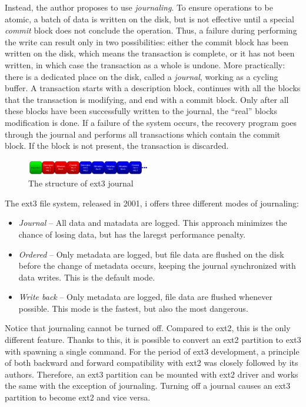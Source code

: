 \documentclass{acm_proc_article-sp}
\begin{document}
Instead, the author proposes to use {\it journaling}. To ensure operations to be atomic, a batch of data is written on the disk, but is not effective until a special {\it commit} block does not conclude the operation. Thus, a failure during performing the write can result only in two possibilities: either the commit block has been written on the disk, which means the transaction is complete, or it has not been written, in which case the transaction as a whole is undone. More practically: there is a dedicated place on the disk, called a {\it journal}, working as a cycling buffer. A transaction starts with a description block, continues with all the blocks that the transaction is modifying, and end with a commit block. Only after all these blocks have been successfully written to the journal, the ``real'' blocks modification is done. If a failure of the system occurs, the recovery program goes through the journal and performs all transactions which contain the commit block. If the block is not present, the transaction is discarded.

\begin{figure}
\centering
\includegraphics[width=0.48\textwidth]{images/journal.pdf}
	\caption{The structure of ext3 journal \cite{takingadvantage}}
\end{figure}

The ext3 file system, released in 2001, i offers three different modes of journaling: \cite{takingadvantage}

\begin{itemize}
	\item {\it Journal} -- All data and matadata are logged. This approach minimizes the chance of losing data, but has the laregst performance penalty.
	\item {\it Ordered} -- Only metadata are logged, but file data are flushed on the disk before the change of metadata occurs, keeping the journal synchronized with data writes. This is the default mode.
	\item {\it Write back} -- Only metadata are logged, file data are flushed whenever possible. This mode is the fastest, but also the most dangerous.
\end{itemize}

Notice that journaling cannot be turned off. Compared to ext2, this is the only different feature. Thanks to this, it is possible to convert an ext2 partition to ext3 with spawning a single command.
For the period of ext3 development, a principle of both backward and forward compatibility with ext2 was closely followed by its authors. Therefore, an ext3 partition can be mounted with ext2 driver and works the same with the exception of journaling. Turning off a journal causes an ext3 partition to become ext2 and vice versa.
\end{document}
